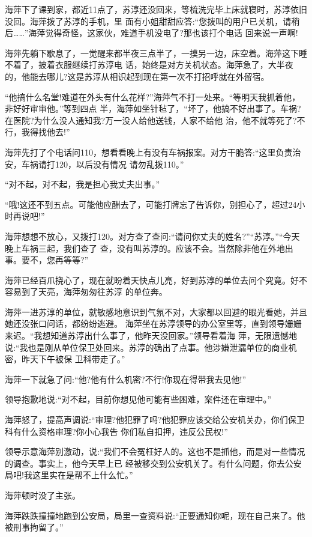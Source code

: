 \documentclass[11pt,a4paper,onecolumn]{article}
\begin{document}
海萍下了课到家，都近11点了，苏淳还没回来，等梳洗完毕上床就寝时，苏淳依旧没回。海萍拨了苏淳的手机，里
面有小姐甜甜应答:``您拨叫的用户已关机，请稍后……''海萍觉得奇怪，这家伙，难道手机没电了?那也该打个电话
回来说一声啊!

海萍先躺下歇息了，一觉醒来都半夜三点半了，一摸另一边，床空着。海萍这下睡不着了，披着衣服继续打苏淳电
话，始终是对方关机状态。海萍急了，大半夜的，他能去哪儿?这是苏淳从相识起到现在第一次不打招呼就在外留宿。

``他搞什么名堂!难道在外头有什么花样?''海萍气不打一处来。``等明天我抓着他，非好好审审他。''等到四点
半，海萍如坐针毡了，``坏了，他搞不好出事了。车祸?在医院?为什么没人通知我?万一没人给他送钱，人家不给他
治，他不就等死了?不行，我得找他去!''

海萍先打了个电话问110，想看看晚上有没有车祸报案。对方干脆答:``这里负责治安，车祸请打120，以后没有情况
请勿乱拨110。''

``对不起，对不起，我是担心我丈夫出事。''

``哦!这还不到五点。可能他应酬去了，可能打牌忘了告诉你，别担心了，超过24小时再说吧!''

海萍想想不放心，又拨打120。对方查了查问:``请问你丈夫的姓名?''``苏淳。''``今天晚上车祸三起，我们查了
查，没有叫苏淳的。应该不会。当然除非他在外地出事。要不，您再等等?''

海萍已经百爪挠心了，现在就盼着天快点儿亮，好到苏淳的单位去问个究竟。好不容易到了天亮，海萍匆匆往苏淳
的单位奔。

海萍一进苏淳的单位，就敏感地意识到气氛不对，大家都以回避的眼光看她，并且她还没张口问话，都纷纷逃避。
海萍坐在苏淳领导的办公室里等，直到领导姗姗来迟。``我想知道苏淳出什么事了，他昨天没回家。''领导看着海
萍，无限遗憾地说:``我也是刚从单位保卫处回来。苏淳的确出了点事。他涉嫌泄漏单位的商业机密，昨天下午被保
卫科带走了。''

海萍一下就急了问:``他?他有什么机密?不行!你现在得带我去见他!''

领导抱歉地说:``对不起，目前你想见他可能有些困难，案件还在审理中。''

海萍怒了，提高声调说:``审理?他犯罪了吗?他犯罪应该交给公安机关办，你们保卫科有什么资格审理?你小心我告
你们私自扣押，违反公民权!''

领导示意海萍别激动，说:``我们不会冤枉好人的。这也不是抓他，而是对一些情况的调查。事实上，他今天早上已
经被移交到公安机关了。有什么问题，你去公安局吧!我这里实在是帮不上什么忙。''

海萍顿时没了主张。

海萍跌跌撞撞地跑到公安局，局里一查资料说:``正要通知你呢，现在自己来了。他被刑事拘留了。''
\end{document}
